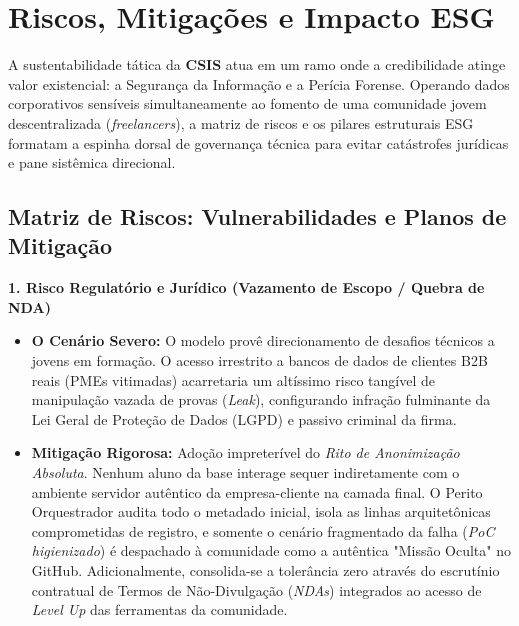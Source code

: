 \documentclass[../main.tex]{subfiles}
\begin{document}
\section{Riscos, Mitigações e Impacto ESG}

A sustentabilidade tática da \textbf{CSIS} atua em um ramo onde a credibilidade atinge valor existencial: a Segurança da Informação e a Perícia Forense. Operando dados corporativos sensíveis simultaneamente ao fomento de uma comunidade jovem descentralizada (\textit{freelancers}), a matriz de riscos e os pilares estruturais ESG formatam a espinha dorsal de governança técnica para evitar catástrofes jurídicas e pane sistêmica direcional.

\subsection{Matriz de Riscos: Vulnerabilidades e Planos de Mitigação}

\textbf{1. Risco Regulatório e Jurídico (Vazamento de Escopo / Quebra de NDA)}
\begin{itemize}
    \item \textbf{O Cenário Severo:} O modelo provê direcionamento de desafios técnicos a jovens em formação. O acesso irrestrito a bancos de dados de clientes B2B reais (PMEs vitimadas) acarretaria um altíssimo risco tangível de manipulação vazada de provas (\textit{Leak}), configurando infração fulminante da Lei Geral de Proteção de Dados (LGPD) e passivo criminal da firma.
    \item \textbf{Mitigação Rigorosa:} Adoção impreterível do \textit{Rito de Anonimização Absoluta}. Nenhum aluno da base interage sequer indiretamente com o ambiente servidor autêntico da empresa-cliente na camada final. O Perito Orquestrador audita todo o metadado inicial, isola as linhas arquitetônicas comprometidas de registro, e somente o cenário fragmentado da falha (\textit{PoC higienizado}) é despachado à comunidade como a autêntica "Missão Oculta" no GitHub. Adicionalmente, consolida-se a tolerância zero através do escrutínio contratual de Termos de Não-Divulgação (\textit{NDAs}) integrados ao acesso de \textit{Level Up} das ferramentas da comunidade.
\end{itemize}
\end{document}
